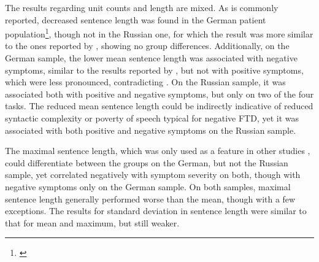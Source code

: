



The results regarding unit counts and length are mixed. As is commonly reported, decreased sentence length was found in the German patient population\footnote{\cite{iter2018automatic, morgan2021natural, spencer2021lower, tang2021natural, bilgrami2022construct, silva2022syntactic, nettekoven2023semantic, schneider2023syntactic, silva2022syntactic}}, though not in the Russian one, for which the result was more similar to the ones reported by \citet{liang2022widespread, gupta2018automated, haas2020linking}, showing no group differences. Additionally, on the German sample, the lower mean sentence length was associated with negative symptoms, similar to the results reported by \citet{bilgrami2022construct}, but not with positive symptoms, which were less pronounced, contradicting \citet{liebenthal2022linguistic}. On the Russian sample, it was associated both with positive and negative symptoms, but only on two of the four tasks. The reduced mean sentence length could be indirectly indicative of reduced syntactic complexity or poverty of speech typical for negative FTD, yet it was associated with both positive and negative symptoms on the Russian sample.

The maximal sentence length, which was only used as a feature in other studies \citep{bedi2015automated, tang2023latent}, could differentiate between the groups on the German, but not the Russian sample, yet correlated negatively with symptom severity on both, though with negative symptoms only on the German sample. On both samples, maximal sentence length generally performed worse than the mean, though with a few exceptions. The results for standard deviation in sentence length were similar to that for mean and maximum, but still weaker.

